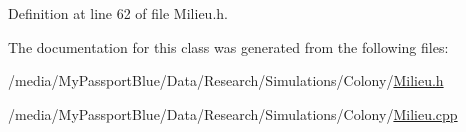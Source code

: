 \-Definition at line 62 of file \-Milieu.\-h.



\-The documentation for this class was generated from the following files\-:\begin{DoxyCompactItemize}
\item 
/media/\-My\-Passport\-Blue/\-Data/\-Research/\-Simulations/\-Colony/\hyperlink{_milieu_8h}{\-Milieu.\-h}\item 
/media/\-My\-Passport\-Blue/\-Data/\-Research/\-Simulations/\-Colony/\hyperlink{_milieu_8cpp}{\-Milieu.\-cpp}\end{DoxyCompactItemize}
